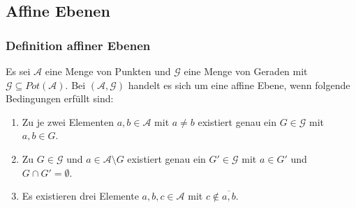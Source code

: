 \documentclass{beamer}
\theoremstyle{plain}
\theoremstyle{definition}
\theoremstyle{rem}
\begin{document}
\subsection{Affine Ebenen}
\begin{frame}
    \frametitle{Definition affiner Ebenen}
    \begin{definition}
        Es sei $\mathcal{A}$ eine Menge von Punkten und $\mathcal{G}$ eine Menge von Geraden mit $\mathcal{G} \subseteq Pot(\mathcal{A})$.
        Bei $(\mathcal{A},\mathcal{G})$ handelt es sich um eine affine Ebene, wenn folgende Bedingungen erfüllt sind:
	\begin{enumerate}[<+(1)->]
            \item Zu je zwei Elementen $a, b\in \mathcal{A}$ mit $a\ne b$ existiert genau ein $G\in\mathcal{G}$ mit $a, b \in G$. \\
            \item Zu $G\in\mathcal{G}$ und $a\in\mathcal{A}\setminus G$ existiert genau ein $G'\in\mathcal{G}$ mit $a\in G'$ und $G\cap G'=\emptyset$. \\
            \item Es existieren drei Elemente $a,b,c\in\mathcal{A}$ mit $c\notin\overline{a,b}$. \\
        \end{enumerate}
    \end{definition}
\end{frame}
\end{document}
